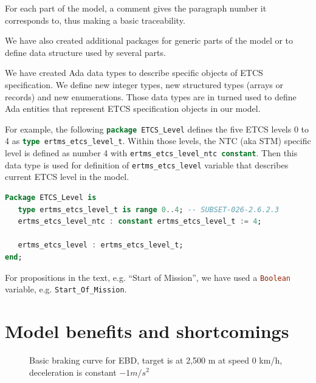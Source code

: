 \documentclass{template/openetcs_report}
\newcommand{\Ada}[1]{\lstinline[language=Ada,basicstyle={\sffamily},framesep=0pt]{#1}}
\begin{document}
For each part of the model, a comment gives the paragraph number it
corresponds to, thus making a basic traceability.

We have also created additional packages for generic parts of the
model or to define data structure used by several parts.

We have created Ada data types to describe specific objects of ETCS
specification. We define new integer types, new structured types
(arrays or records) and new enumerations. Those data types are in
turned used to define Ada entities that represent ETCS specification
objects in our model.

For example, the following \Ada{package ETCS_Level} defines the five
ETCS levels 0 to 4 as \Ada{type ertms_etcs_level_t}. Within those
levels, the NTC (aka STM) specific level is defined as number 4 with
\Ada{ertms_etcs_level_ntc constant}. Then this data type is used for
definition of \Ada{ertms_etcs_level} variable that describes current
ETCS level in the model.

\begin{lstlisting}[language=Ada]
Package ETCS_Level is
   type ertms_etcs_level_t is range 0..4; -- SUBSET-026-2.6.2.3
   ertms_etcs_level_ntc : constant ertms_etcs_level_t := 4;

   ertms_etcs_level : ertms_etcs_level_t;
end;
\end{lstlisting}

For propositions in the text, e.g. ``Start of Mission'', we have used
a \Ada{Boolean} variable, e.g. \Ada{Start_Of_Mission}.

\chapter{Model benefits and shortcomings}

\begin{figure}[htbp]
  \centering
  \caption{Basic braking curve for EBD, target is at 2,500 m at speed
    0 km/h, deceleration is constant $-1 m/s^2$}
  \label{fig:braking-curve}
\end{figure}
\end{document}
